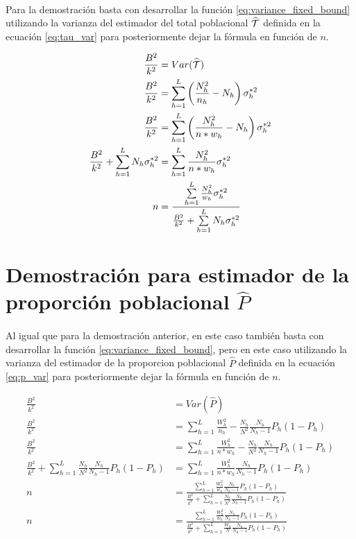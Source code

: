 \documentclass{article}
\begin{document}
    \paragraph{}
    Para la demostración basta con desarrollar la función \eqref{eq:variance_fixed_bound} utilizando la varianza del estimador del total poblacional $\widehat{\mathcal{T}}$ definida en la ecuación \eqref{eq:tau_var} para posteriormente dejar la fórmula en función de $n$.

    \begin{align}
      \frac{B^2}{k^2} &= Var(\widehat{\mathcal{T}}) \\
      \frac{B^2}{k^2} &= \sum\limits_{h=1}^L\left(\frac{N_h^2}{n_h}- N_h\right)\sigma_h^{*2} \\
      \frac{B^2}{k^2} &= \sum\limits_{h=1}^L\left(\frac{N_h^2}{n*w_h}- N_h\right)\sigma_h^{*2} \\
      \frac{B^2}{k^2} + \sum\limits_{h=1}^L N_h \sigma_h^{*2} &=  \sum\limits_{h=1}^L\frac{N_h^2}{n*w_h}\sigma_h^{*2} \\
      n &=  \frac{\sum\limits_{h=1}^L\frac{N_h^2}{w_h}\sigma_h^{*2}}{\frac{B^2}{k^2} + \sum\limits_{h=1}^L N_h \sigma_h^{*2}} \\
    \end{align}

  \section{Demostración para estimador de la proporción poblacional $\widehat{P}$}
  \label{sec:dem2}

    \paragraph{}
    Al igual que para la demostración anterior, en este caso también basta con desarrollar la función \eqref{eq:variance_fixed_bound}, pero en este caso utilizando la varianza del estimador de la proporcion poblacional $\widehat{P}$ definida en la ecuación \eqref{eq:p_var} para posteriormente dejar la fórmula en función de $n$.

    \begin{align}
      \frac{B^2}{k^2} &= Var(\widehat{P}) \\
      \frac{B^2}{k^2} &= \sum\limits_{h=1}^L\frac{W_h^2}{n_h} - \frac{N_h}{N^2}\frac{N_h}{N_h-1}P_h(1-P_h) \\
      \frac{B^2}{k^2} &= \sum\limits_{h=1}^L\frac{W_h^2}{n*w_h} - \frac{N_h}{N^2}\frac{N_h}{N_h-1}P_h(1-P_h) \\
      \frac{B^2}{k^2} + \sum\limits_{h=1}^L\frac{N_h}{N^2}\frac{N_h}{N_h-1}P_h(1-P_h) &= \sum\limits_{h=1}^L\frac{W_h^2}{n*w_h}\frac{N_h}{N_h-1}P_h(1-P_h) \\
      n &= \frac{
        \sum\limits_{h=1}^L\frac{W_h^2}{w_h}\frac{N_h}{N_h-1}P_h(1-P_h)
      }{
        \frac{B^2}{k^2} + \sum\limits_{h=1}^L\frac{N_h}{N^2}\frac{N_h}{N_h-1}P_h(1-P_h)
      } \\
      n &= \frac{
        \sum\limits_{h=1}^L\frac{W_h^2}{w_h}\frac{N_h}{N_h-1}P_h(1-P_h)
      }{\frac{B^2}{k^2} + \sum\limits_{h=1}^L\frac{W_h}{N}\frac{N_h}{N_h-1}P_h(1-P_h)
      } \\
    \end{align}
\end{document}
